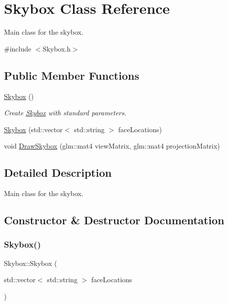 \hypertarget{class_skybox}{}\section{Skybox Class Reference}
\label{class_skybox}


Main class for the skybox.  




{\ttfamily \#include $<$Skybox.\+h$>$}

\subsection*{Public Member Functions}
\begin{DoxyCompactItemize}
\item 
\mbox{\label{class_skybox_a77a92db4492ed94ed4bd101b05ffb1f4}} 
\mbox{\hyperlink{class_skybox_a77a92db4492ed94ed4bd101b05ffb1f4}{Skybox}} ()
\begin{DoxyCompactList}\small\item\em Create \mbox{\hyperlink{class_skybox}{Skybox}} with standard parameters. \end{DoxyCompactList}\item 
\mbox{\hyperlink{class_skybox_aad5a6a76f4074808dd13e1c59fbfedf0}{Skybox}} (std\+::vector$<$ std\+::string $>$ face\+Locations)
\item 
void \mbox{\hyperlink{class_skybox_aced088463aafa7367558c50ec322c73e}{Draw\+Skybox}} (glm\+::mat4 view\+Matrix, glm\+::mat4 projection\+Matrix)
\end{DoxyCompactItemize}


\subsection{Detailed Description}
Main class for the skybox. 

\subsection{Constructor \& Destructor Documentation}
\mbox{\label{class_skybox_aad5a6a76f4074808dd13e1c59fbfedf0}} 
\subsubsection{\texorpdfstring{Skybox()}{Skybox()}}
{\footnotesize\ttfamily Skybox\+::\+Skybox (\begin{DoxyParamCaption}\item[{std\+::vector$<$ std\+::string $>$}]{face\+Locations }\end{DoxyParamCaption})}

